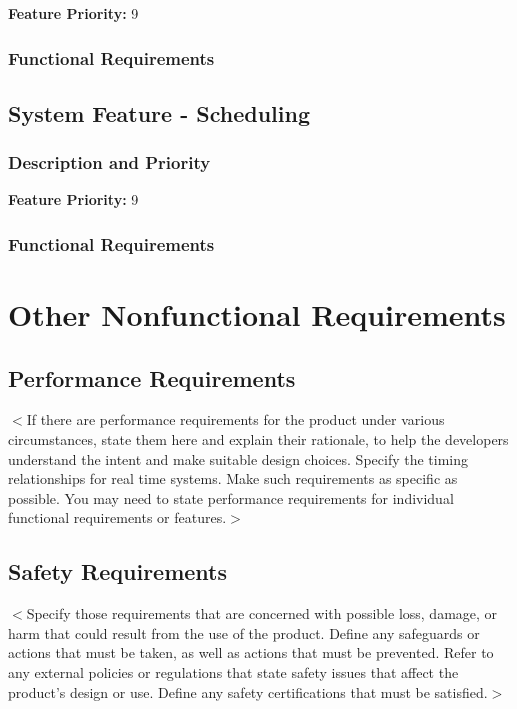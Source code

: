 \documentclass{scrreprt}
\begin{document}
\textbf{Feature Priority: } 9

\subsection{Functional Requirements}



\section{System Feature - Scheduling }

\subsection{Description and Priority}

\textbf{Feature Priority: } 9

\subsection{Functional Requirements}



\chapter{Other Nonfunctional Requirements}

\section{Performance Requirements}
$<$If there are performance requirements for the product under various 
circumstances, state them here and explain their rationale, to help the 
developers understand the intent and make suitable design choices. Specify the 
timing relationships for real time systems. Make such requirements as specific 
as possible. You may need to state performance requirements for individual 
functional requirements or features.$>$

\section{Safety Requirements}
$<$Specify those requirements that are concerned with possible loss, damage, or 
harm that could result from the use of the product. Define any safeguards or 
actions that must be taken, as well as actions that must be prevented. Refer to 
any external policies or regulations that state safety issues that affect the 
product’s design or use. Define any safety certifications that must be 
satisfied.$>$
\end{document}
